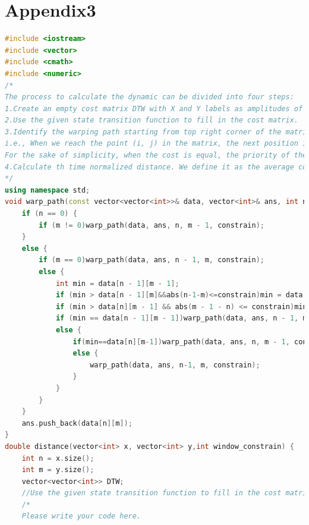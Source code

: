 \documentclass[12pt,a4paper]{article}
\theoremstyle{definition}
\begin{document}
\section{Appendix3}
\begin{lstlisting}[language=C++]
#include <iostream>
#include <vector>
#include <cmath>
#include <numeric>
/*
The process to calculate the dynamic can be divided into four steps:
1.Create an empty cost matrix DTW with X and Y labels as amplitudes of the two series to be compared.
2.Use the given state transition function to fill in the cost matrix.
3.Identify the warping path starting from top right corner of the matrix and traversing to bottom left. The traversal path is identified based on the neighbor with minimum value.
i.e., When we reach the point (i, j) in the matrix, the next position is to choose the point with the smallest cost among (i-1,j-1), (i,j-1), and (i-1,j),
For the sake of simplicity, when the cost is equal, the priority of the selection is (i-1,j-1), (i,j-1), and (i-1,j) in order.
4.Calculate th time normalized distance. We define it as the average cost of the selected points.
*/
using namespace std;
void warp_path(const vector<vector<int>>& data, vector<int>& ans, int n, int m,int constrain) {
    if (n == 0) {
        if (m != 0)warp_path(data, ans, n, m - 1, constrain);
    }
    else {
        if (m == 0)warp_path(data, ans, n - 1, m, constrain);
        else {
            int min = data[n - 1][m - 1];
            if (min > data[n - 1][m]&&abs(n-1-m)<=constrain)min = data[n - 1][m];
            if (min > data[n][m - 1] && abs(m - 1 - n) <= constrain)min = data[n][m - 1];
            if (min == data[n - 1][m - 1])warp_path(data, ans, n - 1, m - 1, constrain);
            else {
                if(min==data[n][m-1])warp_path(data, ans, n, m - 1, constrain);
                else {
                    warp_path(data, ans, n-1, m, constrain);
                }
            }
        }
    }
    ans.push_back(data[n][m]);
}
double distance(vector<int> x, vector<int> y,int window_constrain) {
    int n = x.size();
    int m = y.size();
    vector<vector<int>> DTW;
    //Use the given state transition function to fill in the cost matrix.
    /*
    Please write your code here.
    

\end{lstlisting}
\end{document}
